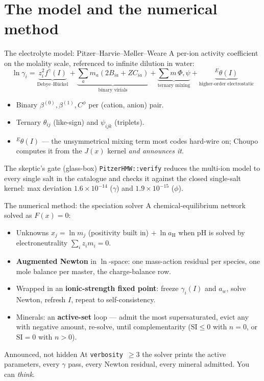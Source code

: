 \documentclass[aspectratio=169,11pt]{beamer}
\begin{document}
\section{The model and the numerical method}

\begin{frame}{The electrolyte model: Pitzer--Harvie--M\o ller--Weare}
A per-ion activity coefficient on the molality scale, referenced to
infinite dilution in water:
\[
  \ln\gamma_i = \underbrace{z_i^2 f^\gamma(I)}_{\text{Debye--H\"uckel}}
  + \underbrace{\textstyle\sum_a m_a(2B_{ia}+ZC_{ia})}_{\text{binary virials}}
  + \underbrace{\textstyle\sum m\,\Phi,\psi}_{\text{ternary mixing}}
  + \underbrace{{}^E\!\theta(I)}_{\text{higher-order electrostatic}}
\]
\begin{itemize}\small
  \item Binary $\beta^{(0)},\beta^{(1)},C^\phi$ per (cation, anion) pair.
  \item Ternary $\theta_{ij}$ (like-sign) and $\psi_{ijk}$ (triplets).
  \item ${}^E\!\theta(I)$ --- the unsymmetrical mixing term most codes hard-wire
        on; Choupo computes it from the $J(x)$ kernel \emph{and announces it}.
\end{itemize}
\begin{block}{The skeptic's gate (glass-box)}
\small \texttt{PitzerHMW::verify} reduces the multi-ion model to every single salt
in the catalogue and checks it against the closed single-salt kernel: max
deviation $1.6\times10^{-14}$ ($\gamma$) and $1.9\times10^{-15}$ ($\phi$).
\end{block}
\end{frame}

\begin{frame}{The numerical method: the speciation solver}
A chemical-equilibrium network solved as \textbf{$F(x)=0$}:
\begin{itemize}\small
  \item Unknowns $x_j=\ln m_j$ (positivity built in) $+\ \ln a_{\mathrm H}$ when
        pH is solved by electroneutrality $\sum_i z_i m_i = 0$.
  \item \textbf{Augmented Newton} in $\ln$-space: one mass-action residual per
        species, one mole balance per master, the charge-balance row.
  \item Wrapped in an \textbf{ionic-strength fixed point}: freeze $\gamma_i(I)$
        and $a_w$, solve Newton, refresh $I$, repeat to self-consistency.
  \item Minerals: an \textbf{active-set} loop --- admit the most supersaturated,
        evict any with negative amount, re-solve, until complementarity
        ($\mathrm{SI}\le 0$ with $n=0$, or $\mathrm{SI}=0$ with $n>0$).
\end{itemize}
\begin{block}{Announced, not hidden}
\small At \texttt{verbosity}~$\ge 3$ the solver prints the active parameters, every
$\gamma$ pass, every Newton residual, every mineral admitted. You can \emph{think}.
\end{block}
\end{frame}
\end{document}
